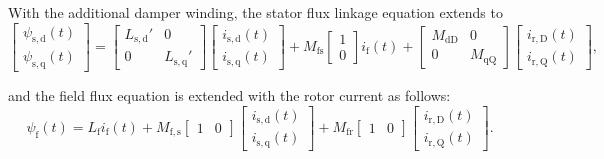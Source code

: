 \begin{solutionblock}
    With the additional damper winding, the stator flux linkage equation extends to
    \begin{equation}
        \begin{bmatrix}
            \psi_{\mathrm{s,d}}(t) \\
            \psi_{\mathrm{s,q}}(t)
        \end{bmatrix}
        =
        \begin{bmatrix}
            L_{\mathrm{s,d}}'   & 0 \\
            0   & L_{\mathrm{s,q}}'
        \end{bmatrix}
        \begin{bmatrix}
            i_{\mathrm{s,d}}(t) \\
            i_{\mathrm{s,q}}(t)
        \end{bmatrix}
        + M_{\mathrm{fs}}
        \begin{bmatrix}
            1 \\
            0
        \end{bmatrix}
        i_{\mathrm{f}}(t) +
        \begin{bmatrix}
            M_{\mathrm{dD}} & 0 \\
            0 & M_{\mathrm{qQ}}
        \end{bmatrix}
        \begin{bmatrix}
            i_{\mathrm{r,D}}(t) \\
            i_{\mathrm{r,Q}}(t)
        \end{bmatrix},
    \end{equation}

    and the field flux equation is extended with the rotor current as follows:
    \begin{equation}
        \psi_{\mathrm{f}}(t) = L_{\mathrm{f}}i_{\mathrm{f}}(t) + M_{\mathrm{f,s}}
        \begin{bmatrix}
            1 & 0
        \end{bmatrix}
        \begin{bmatrix}
            i_{\mathrm{s,d}}(t) \\
            i_{\mathrm{s,q}}(t)
        \end{bmatrix}
        + M_{\mathrm{fr}}
        \begin{bmatrix}
            1 & 0    
        \end{bmatrix}
        \begin{bmatrix}
            i_{\mathrm{r,D}}(t) \\
            i_{\mathrm{r,Q}}(t)
        \end{bmatrix}.
    \end{equation}


\end{solutionblock}
